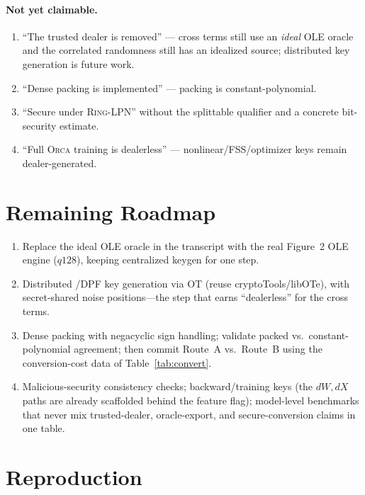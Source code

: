 \documentclass[11pt]{article}
\newcommand{\Orca}{\textsc{Orca}}
\newcommand{\RingLPN}{\textsc{Ring-LPN}}
\newcommand{\SPFSS}{\mathsf{SPFSS}}
\begin{document}
\paragraph{Not yet claimable.}
\begin{enumerate}[leftmargin=*]
  \item ``The trusted dealer is removed'' --- cross terms still use an
  \emph{ideal} OLE oracle and the correlated randomness still has an idealized
  source; distributed \SPFSS{} key generation is future work.
  \item ``Dense packing is implemented'' --- packing is constant-polynomial.
  \item ``Secure under \RingLPN{}'' without the splittable qualifier and a
  concrete bit-security estimate.
  \item ``Full \Orca{} training is dealerless'' --- nonlinear/FSS/optimizer keys
  remain dealer-generated.
\end{enumerate}

\section{Remaining Roadmap}

\begin{enumerate}[leftmargin=*]
  \item[\textbf{5.}] Replace the ideal OLE oracle in the transcript with the real
  Figure~2 OLE engine ($q128$), keeping centralized \SPFSS{} keygen for one
  step.
  \item[\textbf{6.}] Distributed \SPFSS{}/DPF key generation via OT (reuse
  cryptoTools/libOTe), with secret-shared noise positions---the step that earns
  ``dealerless'' for the cross terms.
  \item[\textbf{7.}] Dense packing with negacyclic sign handling; validate packed
  vs.\ constant-polynomial agreement; then commit Route~A vs.\ Route~B using the
  conversion-cost data of Table~\ref{tab:convert}.
  \item[\textbf{Later}] Malicious-security consistency checks; backward/training
  keys (the $dW,dX$ paths are already scaffolded behind the feature flag);
  model-level benchmarks that never mix trusted-dealer, oracle-export, and
  secure-conversion claims in one table.
\end{enumerate}

\section*{Reproduction}
\end{document}
